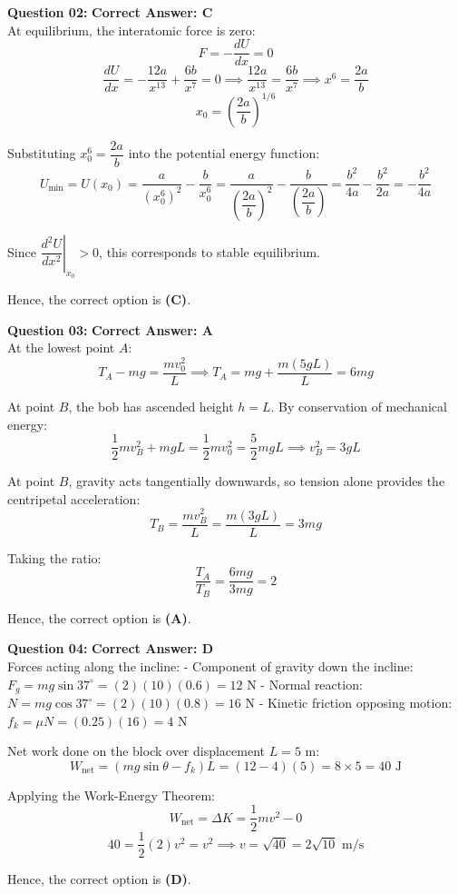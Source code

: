 \documentclass[11pt,a4paper]{article}
\begin{document}
\begin{tcolorbox}[solbox]
\textbf{\textcolor{primaryDark}{Question 02:}} \hfill \textbf{\textcolor{l1Green}{Correct Answer: C}}\\
\vspace{4pt}
At equilibrium, the interatomic force is zero:
$$F = -\frac{dU}{dx} = 0$$
$$\frac{dU}{dx} = -\frac{12a}{x^{13}} + \frac{6b}{x^7} = 0 \implies \frac{12a}{x^{13}} = \frac{6b}{x^7} \implies x^6 = \frac{2a}{b}$$
$$x_0 = \left(\frac{2a}{b}\right)^{1/6}$$

Substituting $x_0^6 = \dfrac{2a}{b}$ into the potential energy function:
$$U_{\min} = U(x_0) = \frac{a}{\left(x_0^6\right)^2} - \frac{b}{x_0^6} = \frac{a}{\left(\dfrac{2a}{b}\right)^2} - \frac{b}{\left(\dfrac{2a}{b}\right)} = \frac{b^2}{4a} - \frac{b^2}{2a} = -\frac{b^2}{4a}$$

Since $\left.\dfrac{d^2U}{dx^2}\right|_{x_0} > 0$, this corresponds to stable equilibrium.

Hence, the correct option is \textbf{(C)}.
\end{tcolorbox}

\begin{tcolorbox}[solbox]
\textbf{\textcolor{primaryDark}{Question 03:}} \hfill \textbf{\textcolor{l1Green}{Correct Answer: A}}\\
\vspace{4pt}
At the lowest point $A$:
$$T_A - mg = \frac{m v_0^2}{L} \implies T_A = mg + \frac{m(5gL)}{L} = 6mg$$

At point $B$, the bob has ascended height $h = L$. By conservation of mechanical energy:
$$\frac{1}{2}m v_B^2 + mgL = \frac{1}{2}m v_0^2 = \frac{5}{2}mgL \implies v_B^2 = 3gL$$

At point $B$, gravity acts tangentially downwards, so tension alone provides the centripetal acceleration:
$$T_B = \frac{m v_B^2}{L} = \frac{m(3gL)}{L} = 3mg$$

Taking the ratio:
$$\frac{T_A}{T_B} = \frac{6mg}{3mg} = 2$$

Hence, the correct option is \textbf{(A)}.
\end{tcolorbox}

\begin{tcolorbox}[solbox]
\textbf{\textcolor{primaryDark}{Question 04:}} \hfill \textbf{\textcolor{l1Green}{Correct Answer: D}}\\
\vspace{4pt}
Forces acting along the incline:
- Component of gravity down the incline: $F_g = mg\sin 37^\circ = (2)(10)(0.6) = 12\text{ N}$
- Normal reaction: $N = mg\cos 37^\circ = (2)(10)(0.8) = 16\text{ N}$
- Kinetic friction opposing motion: $f_k = \mu N = (0.25)(16) = 4\text{ N}$

Net work done on the block over displacement $L = 5\text{ m}$:
$$W_{\text{net}} = (mg\sin\theta - f_k)L = (12 - 4)(5) = 8 \times 5 = 40\text{ J}$$

Applying the Work-Energy Theorem:
$$W_{\text{net}} = \Delta K = \frac{1}{2}m v^2 - 0$$
$$40 = \frac{1}{2}(2)v^2 = v^2 \implies v = \sqrt{40} = 2\sqrt{10}\text{ m/s}$$

Hence, the correct option is \textbf{(D)}.
\end{tcolorbox}
\end{document}
